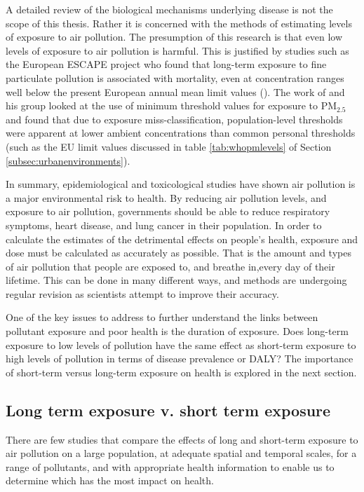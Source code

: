 A detailed review of the biological mechanisms underlying disease is not the scope of this thesis. Rather it is concerned with the methods of estimating levels of exposure to air pollution. The presumption of this research is that even low levels of exposure to air pollution is harmful. This is justified by studies such as the European ESCAPE project who found that long-term exposure to fine particulate pollution is associated with mortality, even at concentration ranges well below the present European annual mean limit values (\cite{Beelen2013}). The work of \cite{Brauer2002} and his group looked at the use of minimum threshold values for exposure to PM$_{2.5}$ and found that due to exposure miss-classification, population-level thresholds were apparent at lower ambient concentrations than common personal thresholds (such as the EU limit values discussed in table \ref{tab:whopmlevels} of Section \ref{subsec:urbanenvironments}).

In summary, epidemiological and toxicological studies have shown air pollution is a major environmental risk to health. By reducing air pollution levels, and exposure to air pollution, governments should be able to reduce respiratory symptoms, heart disease, and lung cancer in their population. In order to calculate the estimates of the detrimental effects on people's health, exposure and dose must be calculated as accurately as possible. That is the amount and types of air pollution that people are exposed to, and breathe in,every day of their lifetime. This can be done in many different ways, and methods are undergoing regular revision as scientists attempt to improve their accuracy. 

One of the key issues to address to further understand the links between pollutant exposure and poor health is the duration of exposure. Does long-term exposure to low levels of pollution have the same effect as short-term exposure to high levels of pollution in terms of disease prevalence or DALY? The importance of short-term versus long-term exposure on health is explored in the next section.


\subsection{Long term exposure v. short term exposure}
\label{subsec:longtermvshortterm}

There are few studies that compare the effects of long and short-term exposure to air pollution on a large population, at adequate spatial and temporal scales, for a range of pollutants, and with appropriate health information to enable us to determine which has the most impact on health.

